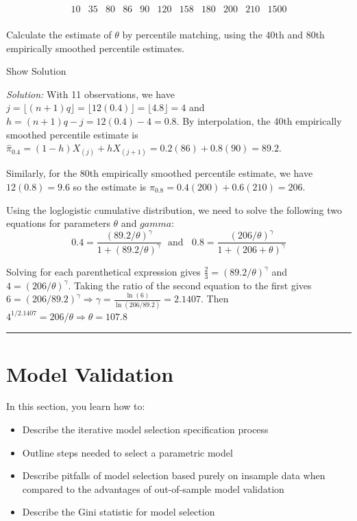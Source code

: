 \documentclass[]{book}
\providecommand{\tightlist}{%
  \setlength{\itemsep}{0pt}\setlength{\parskip}{0pt}}
\theoremstyle{definition}
\theoremstyle{definition}
\theoremstyle{definition}
\theoremstyle{remark}
\begin{document}
\[\begin{array}{ccccccccccc}
10 &35 &80 &86 &90 &120 &158 &180 &200 &210 &1500 \\
\end{array}\]

Calculate the estimate of \(\theta\) by percentile matching, using the
40th and 80th empirically smoothed percentile estimates.

Show Solution

\hypertarget{toggleExamC1}{}
\emph{Solution:} With 11 observations, we have
\(j=\lfloor(n+1)q\rfloor = \lfloor 12(0.4) \rfloor = \lfloor 4.8\rfloor=4\)
and \(h=(n+1)q-j = 12(0.4)-4=0.8\). By interpolation, the 40th
empirically smoothed percentile estimate is
\(\hat{\pi}_{0.4} = (1-h) X_{(j)} + h X_{(j+1)} = 0.2(86)+0.8(90)=89.2\).

Similarly, for the 80th empirically smoothed percentile estimate, we
have \(12(0.8)=9.6\) so the estimate is
\(\hat{\pi}_{0.8} = 0.4(200)+0.6(210)=206\).

Using the loglogistic cumulative distribution, we need to solve the
following two equations for parameters \(\theta\) and \(gamma\):
\[0.4=\frac{(89.2/\theta)^\gamma}{1+(89.2/\theta)^\gamma} \ \ \ \text{and} \ \ \ \   0.8=\frac{(206/\theta)^\gamma}{1+(206+\theta)^\gamma}\]

Solving for each parenthetical expression gives
\(\frac{2}{3}=(89.2/\theta)^\gamma\) and \(4=(206/\theta)^\gamma\).
Taking the ratio of the second equation to the first gives
\(6=(206/89.2)^\gamma \Rightarrow \gamma=\frac{\ln(6)}{\ln(206/89.2)} = 2.1407\).
Then \(4^{1/2.1407}=206/\theta \Rightarrow \theta=107.8\)

\begin{center}\rule{0.5\linewidth}{\linethickness}\end{center}

\section{Model Validation}\label{S:ModelValidation}

In this section, you learn how to:

\begin{itemize}
\tightlist
\item
  Describe the iterative model selection specification process
\item
  Outline steps needed to select a parametric model
\item
  Describe pitfalls of model selection based purely on insample data
  when compared to the advantages of out-of-sample model validation
\item
  Describe the Gini statistic for model selection
\end{itemize}
\end{document}
